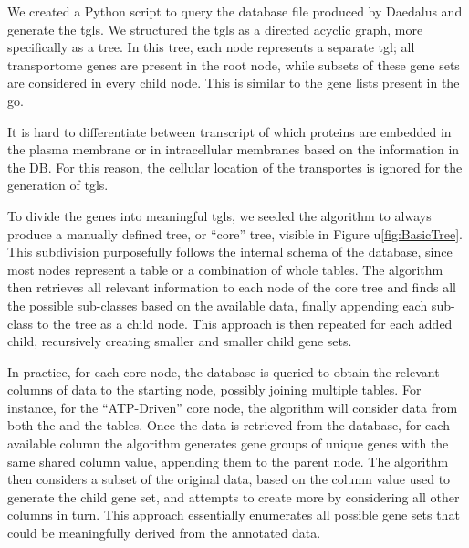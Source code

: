 We created a Python script to query the database file produced by Daedalus and generate the \glspl{tgl}.
We structured the \glspl{tgl} as a directed acyclic graph, more specifically as a tree.
In this tree, each node represents a separate \gls{tgl}; all transportome genes are present in the root node, while subsets of these gene sets are considered in every child node.
This is similar to the gene lists present in the \gls{go}.

It is hard to differentiate between transcript of which proteins are embedded in the plasma membrane or in intracellular membranes based on the information in the DB.
For this reason, the cellular location of the transportes is ignored for the generation of \glspl{tgl}.

To divide the genes into meaningful \glspl{tgl}, we seeded the algorithm to always produce a manually defined tree, or ``core'' tree, visible in Figure u\ref{fig:BasicTree}.
This subdivision purposefully follows the internal schema of the database, since most nodes represent a table or a combination of whole tables.
The algorithm then retrieves all relevant information to each node of the core tree and finds all the possible sub-classes based on the available data, finally appending each sub-class to the tree as a child node.
This approach is then repeated for each added child, recursively creating smaller and smaller child gene sets.

In practice, for each core node, the database is queried to obtain the relevant columns of data to the starting node, possibly joining multiple tables.
For instance, for the ``ATP-Driven'' core node, the algorithm will consider data from both the  and the  tables.
Once the data is retrieved from the database, for each available column the algorithm generates gene groups of unique genes with the same shared column value, appending them to the parent node.
The algorithm then considers a subset of the original data, based on the column value used to generate the child gene set, and attempts to create more by considering all other columns in turn.
This approach essentially enumerates all possible gene sets that could be
meaningfully derived from the annotated data.

